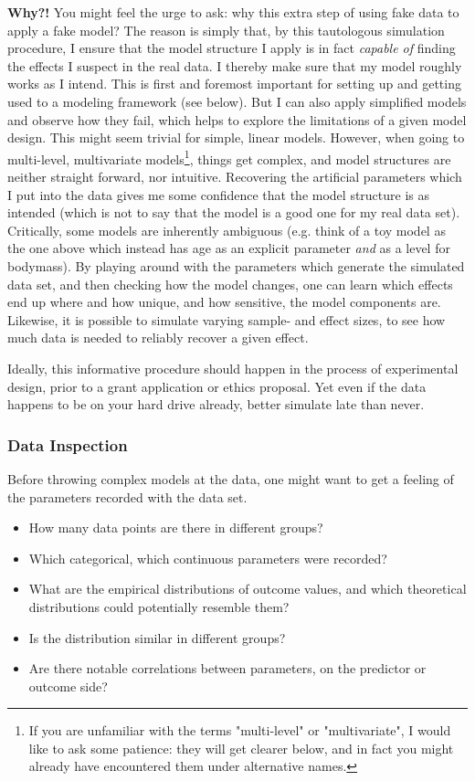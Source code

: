 \textbf{Why?!} You might feel the urge to ask: why this extra step of using fake data to apply a fake model?
The reason is simply that, by this tautologous simulation procedure, I ensure that the model structure I apply is in fact \emph{capable of} finding the effects I suspect in the real data.
I thereby make sure that my model roughly works as I intend.
This is first and foremost important for setting up and getting used to a modeling framework (see below).
But I can also apply simplified models and observe how they fail, which helps to explore the limitations of a given model design.
This might seem trivial for simple, linear models.
However, when going to multi-level, multivariate models\footnote{If you are unfamiliar with the terms "multi-level" or "multivariate", I would like to ask some patience: they will get clearer below, and in fact you might already have encountered them under alternative names.}, things get complex, and model structures are neither straight forward, nor intuitive.
Recovering the artificial parameters which I put into the data gives me some confidence that the model structure is as intended (which is not to say that the model is a good one for my real data set).
Critically, some models are inherently ambiguous (e.g. think of a toy model as the one above which instead has age as an explicit parameter \emph{and} as a level for bodymass).
By playing around with the parameters which generate the simulated data set, and then checking how the model changes, one can learn which effects end up where and how unique, and how sensitive, the model components are.
Likewise, it is possible to simulate varying sample- and effect sizes, to see how much data is needed to reliably recover a given effect.

Ideally, this informative procedure should happen in the process of experimental design, prior to a grant application or ethics proposal.
Yet even if the data happens to be on your hard drive already, better simulate late than never.


\subsubsection{Data Inspection}
\label{sec:orga128476}
Before throwing complex models at the data, one might want to get a feeling of the parameters recorded with the data set.
\begin{itemize}
\item How many data points are there in different groups?
\item Which categorical, which continuous parameters were recorded?
\item What are the empirical distributions of outcome values, and which theoretical distributions could potentially resemble them?
\item Is the distribution similar in different groups?
\item Are there notable correlations between parameters, on the predictor or outcome side?
\end{itemize}

